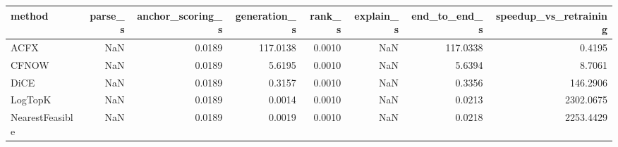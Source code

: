 \begin{tabular}{lrrrrrrr}
\toprule
         method &  parse\_s &  anchor\_scoring\_s &  generation\_s &  rank\_s &  explain\_s &  end\_to\_end\_s &  speedup\_vs\_retraining \\
\midrule
           ACFX &      NaN &            0.0189 &      117.0138 &  0.0010 &        NaN &      117.0338 &                 0.4195 \\
          CFNOW &      NaN &            0.0189 &        5.6195 &  0.0010 &        NaN &        5.6394 &                 8.7061 \\
           DiCE &      NaN &            0.0189 &        0.3157 &  0.0010 &        NaN &        0.3356 &               146.2906 \\
        LogTopK &      NaN &            0.0189 &        0.0014 &  0.0010 &        NaN &        0.0213 &              2302.0675 \\
NearestFeasible &      NaN &            0.0189 &        0.0019 &  0.0010 &        NaN &        0.0218 &              2253.4429 \\
\bottomrule
\end{tabular}
